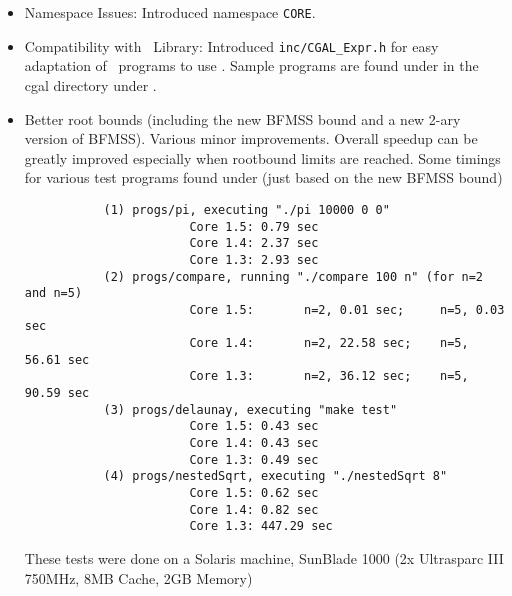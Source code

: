 \documentclass[12pt]{article}
\begin{document}
    \begin{itemize}
        \item
	Namespace Issues:
          Introduced namespace \texttt{CORE}.
       \item
	Compatibility with \cgal\ Library:
          Introduced \texttt{inc/CGAL\_Expr.h} for easy adaptation
	  of \cgal\ programs to use \corelib.  Sample programs are found
	  under in the cgal directory under \examplesdir.
       \item
         Better root bounds (including the new BFMSS bound 
	 and a new 2-ary version of BFMSS).  Various minor improvements.
	 Overall speedup can be greatly improved especially when
	 rootbound limits are reached.
          Some timings for various test programs found
          under \examplesdir (just based on the new BFMSS bound)
	  \begin{verbatim}
           (1) progs/pi, executing "./pi 10000 0 0"
                       Core 1.5: 0.79 sec
                       Core 1.4: 2.37 sec
                       Core 1.3: 2.93 sec
           (2) progs/compare, running "./compare 100 n" (for n=2 and n=5)
                       Core 1.5:       n=2, 0.01 sec;     n=5, 0.03 sec
                       Core 1.4:       n=2, 22.58 sec;    n=5, 56.61 sec
                       Core 1.3:       n=2, 36.12 sec;    n=5, 90.59 sec
           (3) progs/delaunay, executing "make test"
                       Core 1.5: 0.43 sec
                       Core 1.4: 0.43 sec
                       Core 1.3: 0.49 sec
           (4) progs/nestedSqrt, executing "./nestedSqrt 8"
                       Core 1.5: 0.62 sec
                       Core 1.4: 0.82 sec
                       Core 1.3: 447.29 sec
	 \end{verbatim}
           These tests were done on a Solaris machine, SunBlade 1000
               (2x Ultrasparc III 750MHz, 8MB Cache, 2GB Memory)


\end{itemize}
\end{document}
